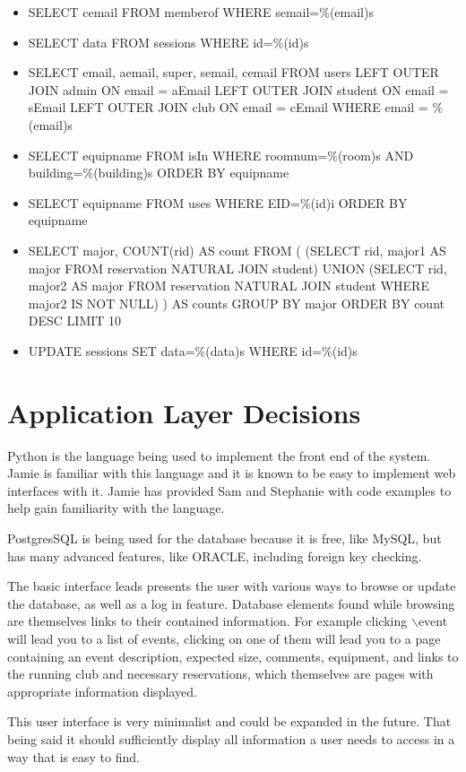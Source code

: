 \documentclass{article}
\begin{document}
\begin{itemize}
\item SELECT cemail FROM memberof WHERE semail=\%(email)s
\item SELECT data FROM sessions WHERE id=\%(id)s
\item SELECT email, aemail, super, semail, cemail FROM users LEFT OUTER JOIN
admin ON email = aEmail LEFT OUTER JOIN student ON email = sEmail LEFT OUTER
JOIN club ON email = cEmail WHERE email = \%(email)s
\item SELECT equipname FROM isIn WHERE roomnum=\%(room)s AND building=\%(building)s ORDER BY equipname
\item SELECT equipname FROM uses WHERE EID=\%(id)i ORDER BY equipname
\item SELECT major, COUNT(rid) AS count FROM ( (SELECT rid, major1 AS major FROM reservation NATURAL JOIN student) UNION (SELECT rid, major2 AS major FROM reservation NATURAL JOIN student WHERE major2 IS NOT NULL) ) AS counts GROUP BY major ORDER BY count DESC LIMIT 10
\item UPDATE sessions SET data=\%(data)s WHERE id=\%(id)s
\end{itemize}

\section{Application Layer Decisions}
Python is the language being used to implement the front end of the system. Jamie is familiar with this language
and it is known to be easy to implement web interfaces with it. Jamie has provided Sam and Stephanie with code examples
to help gain familiarity with the language.

PostgresSQL is being used for the database because it is free, like MySQL, but has many advanced features, like ORACLE,
including foreign key checking.

The basic interface leads presents the user with various ways to browse or update the database, as well as a log in feature.
Database elements found while browsing are themselves links to their contained information.
For example clicking $\backslash$event will lead you to a list of events, clicking on one of them will lead you to a page containing
an event description, expected size, comments, equipment, and links to the running club and necessary reservations,
which themselves are pages with appropriate information displayed.

This user interface is very minimalist and could be expanded in the future. That being said it should sufficiently display
all information a user needs to access in a way that is easy to find.
\end{document}
